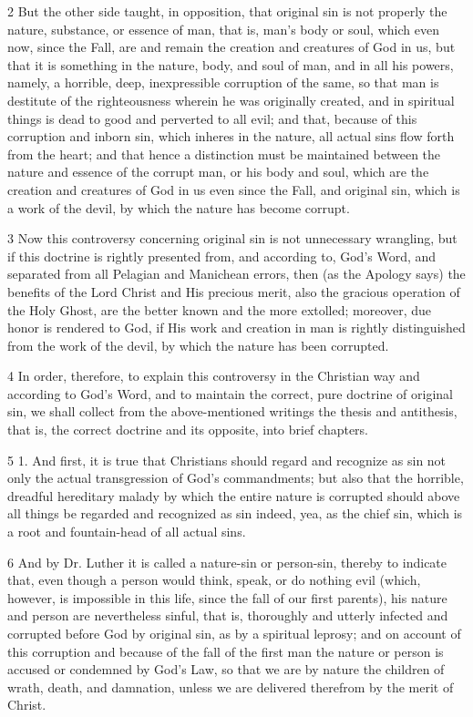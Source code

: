 2 But the other side taught, in opposition, that original sin is not properly the nature, substance, or essence of man, that is, man’s body or soul, which even now, since the Fall, are and remain the creation and creatures of God in us, but that it is something in the nature, body, and soul of man, and in all his powers, namely, a horrible, deep, inexpressible corruption of the same, so that man is destitute of the righteousness wherein he was originally created, and in spiritual things is dead to good and perverted to all evil; and that, because of this corruption and inborn sin, which inheres in the nature, all actual sins flow forth from the heart; and that hence a distinction must be maintained between the nature and essence of the corrupt man, or his body and soul, which are the creation and creatures of God in us even since the Fall, and original sin, which is a work of the devil, by which the nature has become corrupt.

3 Now this controversy concerning original sin is not unnecessary wrangling, but if this doctrine is rightly presented from, and according to, God’s Word, and separated from all Pelagian and Manichean errors, then (as the Apology says) the benefits of the Lord Christ and His precious merit, also the gracious operation of the Holy Ghost, are the better known and the more extolled; moreover, due honor is rendered to God, if His work and creation in man is rightly distinguished from the work of the devil, by which the nature has been corrupted.

4 In order, therefore, to explain this controversy in the Christian way and according to God’s Word, and to maintain the correct, pure doctrine of original sin, we shall collect from the above-mentioned writings the thesis and antithesis, that is, the correct doctrine and its opposite, into brief chapters.

5 1. And first, it is true that Christians should regard and recognize as sin not only the actual transgression of God’s commandments; but also that the horrible, dreadful hereditary malady by which the entire nature is corrupted should above all things be regarded and recognized as sin indeed, yea, as the chief sin, which is a root and fountain-head of all actual sins.

6 And by Dr. Luther it is called a nature-sin or person-sin, thereby to indicate that, even though a person would think, speak, or do nothing evil (which, however, is impossible in this life, since the fall of our first parents), his nature and person are nevertheless sinful, that is, thoroughly and utterly infected and corrupted before God by original sin, as by a spiritual leprosy; and on account of this corruption and because of the fall of the first man the nature or person is accused or condemned by God’s Law, so that we are by nature the children of wrath, death, and damnation, unless we are delivered therefrom by the merit of Christ.

